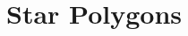 \documentclass[]{article}
\title{Star Polygons}
\begin{document}
\maketitle
\renewcommand{\arraystretch}{1.5}

\end{document}
